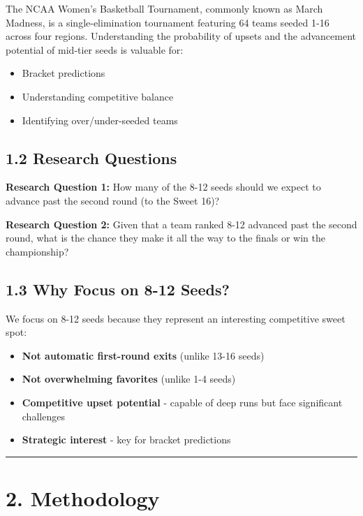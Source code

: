 \documentclass[
]{article}
\providecommand{\tightlist}{%
  \setlength{\itemsep}{0pt}\setlength{\parskip}{0pt}}
\begin{document}
The NCAA Women's Basketball Tournament, commonly known as March Madness,
is a single-elimination tournament featuring 64 teams seeded 1-16 across
four regions. Understanding the probability of upsets and the
advancement potential of mid-tier seeds is valuable for:

\begin{itemize}
\tightlist
\item
  Bracket predictions
\item
  Understanding competitive balance
\item
  Identifying over/under-seeded teams
\end{itemize}

\subsection{1.2 Research Questions}\label{research-questions}

\textbf{Research Question 1:} How many of the 8-12 seeds should we
expect to advance past the second round (to the Sweet 16)?

\textbf{Research Question 2:} Given that a team ranked 8-12 advanced
past the second round, what is the chance they make it all the way to
the finals or win the championship?

\subsection{1.3 Why Focus on 8-12 Seeds?}\label{why-focus-on-8-12-seeds}

We focus on 8-12 seeds because they represent an interesting competitive
sweet spot:

\begin{itemize}
\tightlist
\item
  \textbf{Not automatic first-round exits} (unlike 13-16 seeds)
\item
  \textbf{Not overwhelming favorites} (unlike 1-4 seeds)
\item
  \textbf{Competitive upset potential} - capable of deep runs but face
  significant challenges
\item
  \textbf{Strategic interest} - key for bracket predictions
\end{itemize}

\begin{center}\rule{0.5\linewidth}{0.5pt}\end{center}

\section{2. Methodology}\label{methodology}
\end{document}

